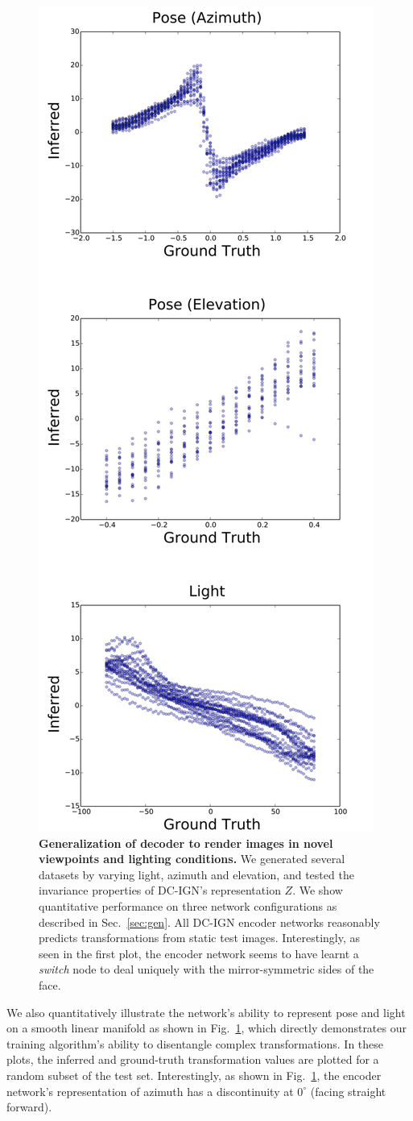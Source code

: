 \documentclass[12pt,twoside]{mitthesis}
\begin{document}
\begin{figure}[htbp]
\centering
\includegraphics[height=0.95000\textwidth]{../figures/extrinsic-inference-scatter.png}
\caption{\label{fig:gen}\textbf{Generalization of decoder to render
images in novel viewpoints and lighting conditions.} We generated
several datasets by varying light, azimuth and elevation, and tested the
invariance properties of DC-IGN's representation \(Z\). We show
quantitative performance on three network configurations as described in
Sec.~\ref{sec:gen}. All DC-IGN encoder networks reasonably predicts
transformations from static test images. Interestingly, as seen in the
first plot, the encoder network seems to have learnt a \emph{switch}
node to deal uniquely with the mirror-symmetric sides of the face.}
\end{figure}

We also quantitatively illustrate the network's ability to represent
pose and light on a smooth linear manifold as shown in
Fig.~\ref{fig:gen}, which directly demonstrates our training algorithm's
ability to disentangle complex transformations. In these plots, the
inferred and ground-truth transformation values are plotted for a random
subset of the test set. Interestingly, as shown in Fig.~\ref{fig:gen},
the encoder network's representation of azimuth has a discontinuity at
\(0^\circ\) (facing straight forward).
\end{document}
